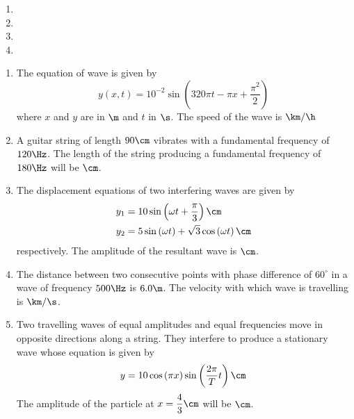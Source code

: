 \documentclass{article}
\begin{document}
\begin{enumerate}
\item 

\item 
\item 

\item 
\pagebreak










 



\end{enumerate}

\pagebreak

\jeeSectionB
\begin{enumerate}\addtocounter{enumi}{20}
\item The equation of wave is given by \[ y(x, t) = 10^{-2}\sin\left(320\pi t -\pi x + \dfrac{\pi^2}{2}\right) \] where $x$ and $y$ are in $\m$ and $t$ in $\s$. The speed of the wave is \hrulefill $\km/\h$

\item A guitar string of length $90 \cm$ vibrates with a fundamental frequency of $120 \Hz$. The length of the string producing a fundamental frequency of $180 \Hz$ will be \hrulefill $\cm$. 

\item The displacement equations of two interfering waves are given by
	\begin{align*}
		y_1 &= 10\sin\left(\omega t + \dfrac{\pi}{3}\right) \cm\\
		y_2 &= 5\sin\left(\omega t\right) + \sqrt{3}\cos\left(\omega t\right) \cm
	\end{align*}
	respectively. The amplitude of the resultant wave is \hrulefill $\cm$. 

\item The distance between two consecutive points with phase difference of $60^\circ$ in a wave of frequency $500 \Hz$ is $6.0 \m$. The velocity with which wave is travelling is \hrulefill $\km/\s$. 

\item Two travelling waves of equal amplitudes and equal frequencies move in opposite directions along a string. They interfere to produce a stationary wave whose equation is given by \[ y=10\cos\left(\pi x\right)\sin\left(\dfrac{2\pi}{T}t\right) \cm\] The amplitude of the particle at $x=\dfrac{4}{3} \cm$ will be \hrulefill $\cm$. 


\end{enumerate}
\end{document}
